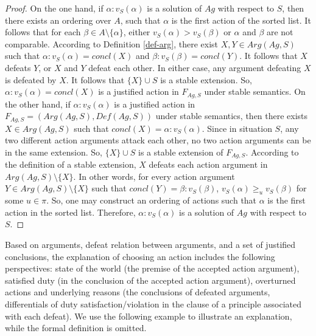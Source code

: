 \documentclass[letterpaper]{article} %
\newtheorem{proof}{Proof}
\begin{document}
\begin{proof}
On the one hand, if $\alpha : v_{S}(\alpha)$ is a  solution of $Ag$ with respect to $S$, then there exists an ordering over $A$, such that $\alpha$ is the first action of the sorted list. It follows that for each $\beta\in A \setminus \{\alpha\}$, either $v_{S}(\alpha) > v_{S}(\beta)$ or $\alpha$ and $\beta$ are not comparable. 
According to Definition \ref{def-arg}, there exist $X, Y\in Arg(Ag, S)$ such that $\alpha : v_{S}(\alpha) = concl(X)$ and $\beta : v_{S}(\beta) = concl(Y)$. It follows that $X$ defeats $Y$, or $X$ and $Y$ defeat each other. In either case, any argument defeating $X$ is defeated by $X$. It follows that $\{X\}\cup S$ is a stable extension. So, $\alpha : v_{S}(\alpha) = concl(X)$ is a justified action in $F_{Ag, S}$ under stable  semantics. 
On the other hand, if $\alpha : v_{S}(\alpha)$ is a justified action in $F_{Ag, S} = (Arg(Ag, S), Def(Ag, S))$ under stable semantics, then there exists $X\in Arg(Ag, S)$ such that $concl(X) = \alpha : v_{S}(\alpha)$. Since in situation $S$, any two different action arguments attack each other, no two action arguments can be in the same extension. So, $\{X\}\cup S$ is a stable extension of $F_{Ag, S}$. According to the definition of a stable extension, $X$ defeats each action argument in $Arg(Ag, S)\setminus \{X\}$. In other words, for every action argument $Y\in  Arg(Ag, S)\setminus \{X\}$ such that $concl(Y) = \beta: v_{S}(\beta)$, $v_{S}(\alpha) \ge_u v_{S}(\beta)$ for some $u\in\pi$. So, one may construct an ordering of actions such that $\alpha$ is the first action in the sorted list. Therefore, $\alpha : v_{S}(\alpha)$ is a solution of $Ag$ with respect to $S$.
\end{proof}

Based on arguments, defeat relation between arguments, and a set of justified conclusions, the explanation of choosing an action includes the following perspectives: state of the world (the premise of the accepted action argument), satisfied duty (in the conclusion of the accepted action argument), overturned actions and underlying reasons (the conclusions of defeated arguments, differentials of duty satisfaction/violation in the clause of a principle associated with each defeat). We use the following example to illustrate an explanation, while the formal definition is omitted. 
\end{document}
